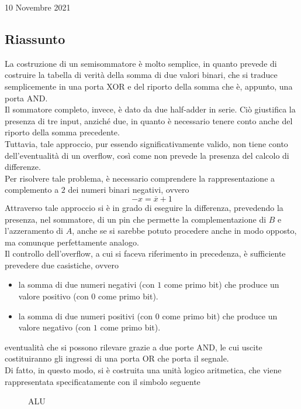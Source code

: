 \documentclass[a4paper]{extarticle}
\begin{document}
\newpage
\begin{center}
    10 Novembre 2021
\end{center}

\subsection{Riassunto}
La costruzione di un semisommatore è molto semplice, in quanto prevede di costruire la tabella di verità della somma di due valori binari, che si traduce semplicemente in una porta XOR e del riporto della somma che è, appunto, una porta AND.\\
Il sommatore completo, invece, è dato da due half-adder in serie. Ciò giustifica la presenza di tre input, anziché due, in quanto è necessario tenere conto anche del riporto della somma precedente.\\
Tuttavia, tale approccio, pur essendo significativamente valido, non tiene conto dell'eventualità di un overflow, così come non prevede la presenza del calcolo di differenze.\\
Per risolvere tale problema, è necessario comprendere la rappresentazione a complemento a \(2\) dei numeri binari negativi, ovvero
\[-x = \overline{x} + 1\]
Attraverso tale approccio si è in grado di eseguire la differenza, prevedendo la presenza, nel sommatore, di un pin che permette la complementazione di \(B\) e l'azzeramento di \(A\), anche se si sarebbe potuto procedere anche in modo opposto, ma comunque perfettamente analogo.\\
Il controllo dell'overflow, a cui si faceva riferimento in precedenza, è sufficiente prevedere due casistiche, ovvero
\begin{itemize}
    \item la somma di due numeri negativi (con \(1\) come primo bit) che produce un valore positivo (con \(0\) come primo bit).

    \item la somma di due numeri positivi (con \(0\) come primo bit) che produce un valore negativo (con \(1\) come primo bit).
\end{itemize}
eventualità che si possono rilevare grazie a due porte AND, le cui uscite costituiranno gli ingressi di una porta OR che porta il segnale.\\
Di fatto, in questo modo, si è costruita una unità logico aritmetica, che viene rappresentata specificatamente con il simbolo seguente

\begin{figure}[H]
    \centering
    \caption{ALU}
    \label{fig:alu}
\end{figure}
\end{document}
